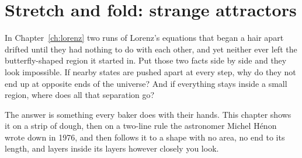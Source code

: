 
\chapter{Stretch and fold: strange attractors}
\label{ch:strange}

\noindent
In Chapter~\ref{ch:lorenz} two runs of Lorenz's equations that began a hair
apart drifted until they had nothing to do with each other, and yet neither
ever left the butterfly-shaped region it started in. Put those two facts side
by side and they look impossible. If nearby states are pushed apart at every
step, why do they not end up at opposite ends of the universe? And if
everything stays inside a small region, where does all that separation go?

The answer is something every baker does with their hands. This chapter
shows it on a strip of dough, then on a two-line rule the astronomer Michel
Hénon wrote down in 1976, and then follows it to a shape with no area, no end
to its length, and layers inside its layers however closely you look.

\begin{outcomes}
\end{outcomes}

